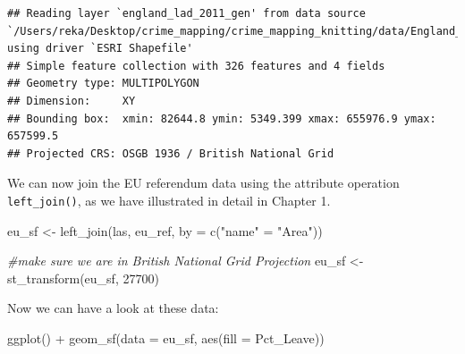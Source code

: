 \documentclass[
]{book}
\newenvironment{Shaded}{\begin{snugshade}}{\end{snugshade}}
\newcommand{\AttributeTok}[1]{\textcolor[rgb]{0.77,0.63,0.00}{#1}}
\newcommand{\CommentTok}[1]{\textcolor[rgb]{0.56,0.35,0.01}{\textit{#1}}}
\newcommand{\DecValTok}[1]{\textcolor[rgb]{0.00,0.00,0.81}{#1}}
\newcommand{\FunctionTok}[1]{\textcolor[rgb]{0.00,0.00,0.00}{#1}}
\newcommand{\NormalTok}[1]{#1}
\newcommand{\OtherTok}[1]{\textcolor[rgb]{0.56,0.35,0.01}{#1}}
\newcommand{\SpecialCharTok}[1]{\textcolor[rgb]{0.00,0.00,0.00}{#1}}
\newcommand{\StringTok}[1]{\textcolor[rgb]{0.31,0.60,0.02}{#1}}
\begin{document}
\begin{verbatim}
## Reading layer `england_lad_2011_gen' from data source `/Users/reka/Desktop/crime_mapping/crime_mapping_knitting/data/England_lad_2011_gen/england_lad_2011_gen.shp' using driver `ESRI Shapefile'
## Simple feature collection with 326 features and 4 fields
## Geometry type: MULTIPOLYGON
## Dimension:     XY
## Bounding box:  xmin: 82644.8 ymin: 5349.399 xmax: 655976.9 ymax: 657599.5
## Projected CRS: OSGB 1936 / British National Grid
\end{verbatim}

We can now join the EU referendum data using the attribute operation \texttt{left\_join()}, as we have illustrated in detail in Chapter 1.

\begin{Shaded}
\begin{Highlighting}[]
\NormalTok{eu\_sf }\OtherTok{\textless{}{-}} \FunctionTok{left\_join}\NormalTok{(las, eu\_ref, }\AttributeTok{by =} \FunctionTok{c}\NormalTok{(}\StringTok{"name"} \OtherTok{=} \StringTok{"Area"}\NormalTok{))}

\CommentTok{\#make sure we are in British National Grid Projection}
\NormalTok{eu\_sf }\OtherTok{\textless{}{-}} \FunctionTok{st\_transform}\NormalTok{(eu\_sf, }\DecValTok{27700}\NormalTok{)}
\end{Highlighting}
\end{Shaded}

Now we can have a look at these data:

\begin{Shaded}
\begin{Highlighting}[]
\FunctionTok{ggplot}\NormalTok{() }\SpecialCharTok{+}
  \FunctionTok{geom\_sf}\NormalTok{(}\AttributeTok{data =}\NormalTok{ eu\_sf, }\FunctionTok{aes}\NormalTok{(}\AttributeTok{fill =}\NormalTok{ Pct\_Leave)) }
\end{Highlighting}
\end{Shaded}
\end{document}

